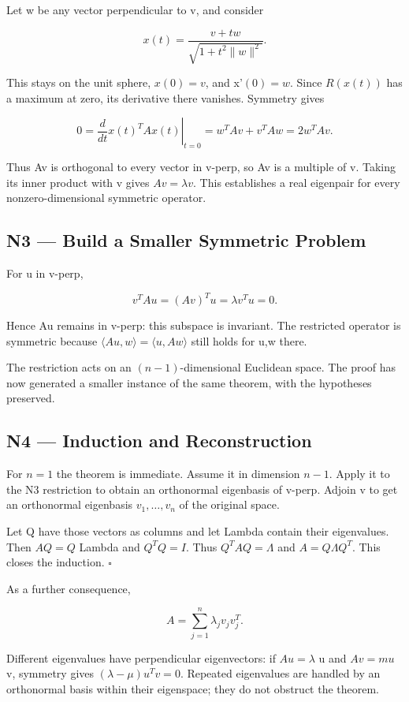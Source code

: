 \documentclass[preprint,12pt,aps,pra,showkeys,amsmath,amssymb,superscriptaddress,floatfix]{revtex4-2}
\theoremstyle{definition}
\theoremstyle{remark}
\begin{document}
Let w be any vector perpendicular to v, and consider

\[x(t)=\frac{v+tw}{\sqrt{1+t^2\|w\|^2}}.\]

This stays on the unit sphere, \(x(0)=v\), and x'\((0)=w\). Since
\(R(x(t))\) has a maximum at zero, its derivative there vanishes.
Symmetry gives

\[0=\left.\frac d{dt}x(t)^TAx(t)\right|_{t=0}=w^TAv+v^TAw=2w^TAv.\]

Thus Av is orthogonal to every vector in v-perp, so Av is a multiple of
v. Taking its inner product with v gives \(Av=\lambda v\). This
establishes a real eigenpair for every nonzero-dimensional symmetric
operator.

\subsection{N3 --- Build a Smaller Symmetric
Problem}\label{n3-build-a-smaller-symmetric-problem}

For u in v-perp,

\[v^TAu=(Av)^Tu=\lambda v^Tu=0.\]

Hence Au remains in v-perp: this subspace is invariant. The restricted
operator is symmetric because
\(\langle Au,w\rangle=\langle u,Aw\rangle\) still holds for u,w there.

The restriction acts on an \((n-1)\)-dimensional Euclidean space. The
proof has now generated a smaller instance of the same theorem, with the
hypotheses preserved.

\subsection{N4 --- Induction and
Reconstruction}\label{n4-induction-and-reconstruction}

For \(n=1\) the theorem is immediate. Assume it in dimension \(n-1\).
Apply it to the N3 restriction to obtain an orthonormal eigenbasis of
v-perp. Adjoin v to get an orthonormal eigenbasis \(v_1,\ldots,v_n\) of
the original space.

Let Q have those vectors as columns and let Lambda contain their
eigenvalues. Then \(AQ=Q\) Lambda and \(Q^{T}Q=I\). Thus
\(Q^TAQ=\Lambda\) and \(A=Q\Lambda Q^T\). This closes the induction.
\(\square\)

As a further consequence,

\[A=\sum_{j=1}^n\lambda_jv_jv_j^T.\]

Different eigenvalues have perpendicular eigenvectors: if \(Au=\lambda\)
u and \(Av=mu\) v, symmetry gives \((\lambda-\mu)u^Tv=0\). Repeated
eigenvalues are handled by an orthonormal basis within their eigenspace;
they do not obstruct the theorem.
\end{document}
